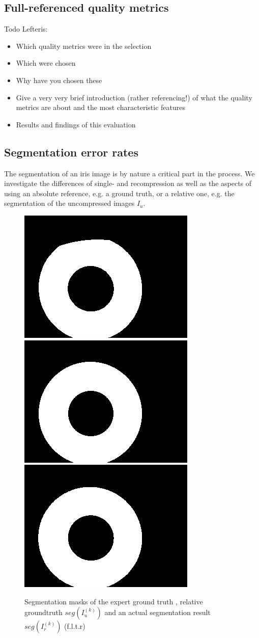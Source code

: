 \documentclass[10pt,twocolumn,letterpaper]{article}
\begin{document}
\subsection{Full-referenced quality metrics}
Todo Lefteris:
\begin{itemize}
 \item Which quality metrics were in the selection
 \item Which were chosen
 \item Why have you chosen these
 \item Give a very very brief introduction (rather referencing!) of what the quality metrics are about and the most characteristic features
 \item Results and findings of this evaluation
\end{itemize}

\subsection{Segmentation error rates}
\label{section:ser}
The segmentation of an iris image is by nature a critical part in the process. We investigate the differences of single- and recompression as well as the aspects of using an absolute reference, e.g. a ground truth, or a relative one, e.g. the segmentation of the uncompressed images $I_u$.

\begin{figure}
\begin{center}

  \includegraphics[width=0.3\linewidth]{img/segMasks/gt.png}
  \includegraphics[width=0.3\linewidth]{img/segMasks/jpg_caht_q100_cr5.png}
  \includegraphics[width=0.3\linewidth]{img/segMasks/jpg_wahet_q100_cr5.png}
  \end{center}
  
  \label{fig:segMasks}
  \caption{Segmentation masks of the expert ground truth \cite{severeCompression}, relative groundtruth $seg(I_u^{(k)})$ and an actual segmentation result $seg(I_r^{(k)})$ (f.l.t.r)}
\end{figure}
\end{document}
